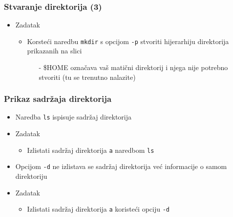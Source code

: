 \documentclass{beamer}
\begin{document}
\begin{frame}[t]
\frametitle{Stvaranje direktorija (3)}
\begin{itemize}
  \item Zadatak
  \begin{itemize}
    \item Korsteći naredbu \texttt{mkdir} s opcijom \texttt{-p} stvoriti
          hijerarhiju direktorija prikazanih na slici
    \begin{itemize}
      \item[-] \$HOME označava vaš matični direktorij i njega nije
                potrebno stvoriti (tu se trenutno nalazite)
    \end{itemize}
  \end{itemize}
  \centering
\end{itemize}
\end{frame}

\begin{frame}[t]
\frametitle{Prikaz sadržaja direktorija}
\begin{itemize}
  \item Naredba \texttt{ls} ispisuje sadržaj direktorija
  \item Zadatak
  \begin{itemize}
    \item Izlistati sadržaj direktorija \texttt{a} naredbom \texttt{ls}
  \end{itemize}
  \item Opcijom \texttt{-d} ne izlistava se sadržaj direktorija već 
        informacije o samom direktoriju
  \item Zadatak
  \begin{itemize}
    \item Izlistati sadržaj direktorija \texttt{a} koristeći opciju 
          \texttt{-d}
  \end{itemize}
\end{itemize}
\end{frame}
    
\end{document}
